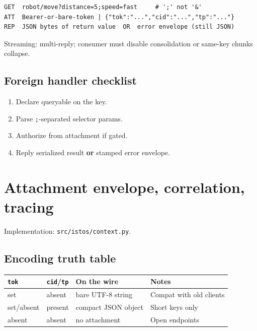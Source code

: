 \documentclass[11pt,a4paper]{article}
\begin{document}
\begin{lstlisting}[language={}]
GET  robot/move?distance=5;speed=fast     # ';' not '&'
ATT  Bearer-or-bare-token | {"tok":"...","cid":"...","tp":"..."}
REP  JSON bytes of return value  OR  error envelope (still JSON)
\end{lstlisting}

Streaming: multi-reply; consumer must disable consolidation or same-key chunks
collapse.

\subsection{Foreign handler checklist}

\begin{enumerate}[leftmargin=*]
  \item Declare queryable on the key.
  \item Parse \texttt{;}-separated selector params.
  \item Authorize from attachment if gated.
  \item Reply serialized result \textbf{or} stamped error envelope.
\end{enumerate}

\section{Attachment envelope, correlation, tracing}
\label{sec:envelope}

Implementation: \texttt{src/istos/context.py}.

\subsection{Encoding truth table}

\begin{center}
\begin{tabularx}{\textwidth}{@{}lllX@{}}
\toprule
\texttt{tok} & \texttt{cid}/\texttt{tp} & On the wire & Notes \\
\midrule
set & absent & bare UTF-8 string & Compat with old clients \\
set/absent & present & compact JSON object & Short keys only \\
absent & absent & no attachment & Open endpoints \\
\bottomrule
\end{tabularx}
\end{center}
\end{document}
